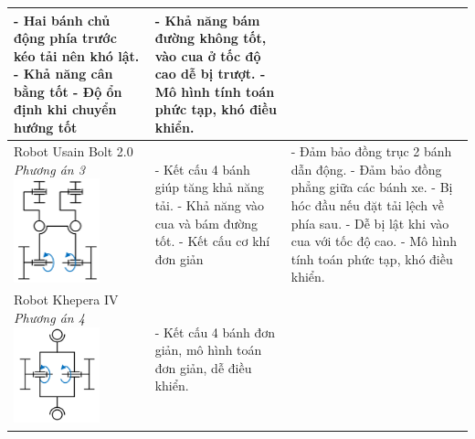 \begin{longtable}{|p{4cm}|p{5cm}|p{5cm}|}
                - Hai bánh chủ động phía trước kéo tải nên khó lật. \newline
                - Khả năng cân bằng tốt \newline
                - Độ ổn định khi chuyển hướng tốt & 
                - Khả năng bám đường không tốt, vào cua ở tốc độ cao dễ bị trượt. \newline
                - Mô hình tính toán phức tạp, khó điều khiển. \\
                \hline
                Robot Usain Bolt 2.0 \newline
                \textit{Phương án 3} \newline
                \includegraphics[width=2.5cm]{pictures/chapter2/robot_usain.png} & 
                - Kết cấu 4 bánh giúp tăng khả năng tải. \newline
                - Khả năng vào cua và bám đường tốt. \newline
                - Kết cấu cơ khí đơn giản & 
                - Đảm bảo đồng trục 2 bánh dẫn động. \newline
                - Đảm bảo đồng phẳng giữa các bánh xe. \newline
                - Bị hóc đầu nếu đặt tải lệch về phía sau. \newline
                - Dễ bị lật khi vào cua với tốc độ cao. \newline
                - Mô hình tính toán phức tạp, khó điều khiển. \\
                \hline
                Robot Khepera IV \newline
                \textit{Phương án 4} \newline
                \includegraphics[width=2.5cm]{pictures/chapter2/robot_khepera_IV.png} &
                - Kết cấu 4 bánh đơn giản, mô hình toán đơn giản, dễ điều khiển.\newline 

\end{longtable}
